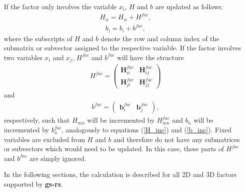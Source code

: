 If the factor only involves the variable $x_i$, $H$ and $b$ are updated as follows:
\begin{align}
\label{H_inc}
H_{ii} = H_{ii} + H^{fac},
\end{align}
\begin{align}
\label{b_inc}
b_i = b_i + b^{fac},
\end{align}
where the subscripts of $H$ and $b$ denote the row and column index of the submatrix or subvector assigned to the respective variable. If the factor involves two variables $x_i$ and $x_j$, $H^{fac}$ and $b^{fac}$ will have the structure
\begin{align}
H^{fac} =
\begin{pmatrix}
\boldsymbol{H}^{fac}_{ii} & \boldsymbol{H}^{fac}_{ij}\\
\boldsymbol{H}^{fac}_{ji} & \boldsymbol{H}^{fac}_{jj}
\end{pmatrix}
\end{align}
and
\begin{align}
b^{fac} =
\begin{pmatrix}
\boldsymbol{b}^{fac}_{i} & \boldsymbol{b}^{fac}_{j}
\end{pmatrix},
\end{align}
respectively, such that $H_{mn}$ will be incremented by $H^{fac}_{mn}$ and $b_n$ will be incremented by $b^{fac}_n$, analogously to equations (\ref{H_inc}) and (\ref{b_inc}). Fixed variables are excluded from $H$ and $b$ and therefore do not have any submatrices or subvectors which would need to be updated. In this case, these parts of $H^{fac}$ and $b^{fac}$ are simply ignored.

In the following sections, the calculation is described for all 2D and 3D factors supported by \textbf{gs-rs}.